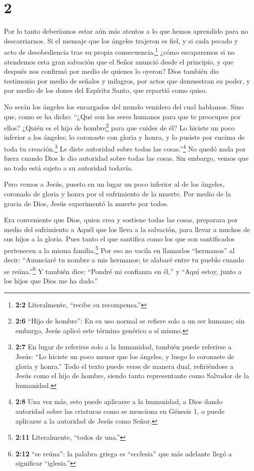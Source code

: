 \hypertarget{section-1}{%
\section{2}\label{section-1}}

 Por lo tanto deberíamos estar aún más atentos a lo que
hemos aprendido para no descarriarnos.  Si el mensaje que
los ángeles trajeron es fiel, y si cada pecado y acto de desobediencia
trae su propia consecuencia,\footnote{\textbf{2:2} Literalmente,
  ``recibe su recompensa.''}  ¿cómo escaparemos si no
atendemos esta gran salvación que el Señor anunció desde el principio, y
que después nos confirmó por medio de quienes lo oyeron? 
Dios también dio testimonio por medio de señales y milagros, por actos
que demuestran su poder, y por medio de los dones del Espíritu Santo,
que repartió como quiso.

 No serán los ángeles los encargados del mundo venidero del
cual hablamos.  Sino que, como se ha dicho: ``¿Qué son los
seres humanos para que te preocupes por ellos? ¿Quién es el hijo de
hombre\footnote{\textbf{2:6} ``Hijo de hombre'': En su uso normal se
  refiere solo a un ser humano; sin embargo, Jesús aplicó este término
  genérico a sí mismo.} para que cuides de él?  Lo hiciste
un poco inferior a los ángeles; lo coronaste con gloria y honra, y lo
pusiste por encima de toda tu creación.\footnote{\textbf{2:7} En lugar
  de referirse solo a la humanidad, también puede referirse a Jesús:
  ``Lo hiciste un poco menor que los ángeles, y luego lo coronaste de
  gloria y honra.'' Todo el texto puede verse de manera dual,
  refiriéndose a Jesús como el hijo de hombre, siendo tanto
  representante como Salvador de la humanidad.}  Le diste
autoridad sobre todas las cosas.''\footnote{\textbf{2:8} Una vez más,
  esto puede aplicarse a la humanidad, a Dios dando autoridad sobre las
  criaturas como se menciona en Génesis 1, o puede aplicarse a la
  autoridad de Jesús como Señor.} No quedó nada por fuera cuando Dios le
dio autoridad sobre todas las cosas. Sin embargo, vemos que no todo está
sujeto a su autoridad todavía.

 Pero vemos a Jesús, puesto en un lugar un poco inferior al
de los ángeles, coronado de gloria y honra por el sufrimiento de la
muerte. Por medio de la gracia de Dios, Jesús experimentó la muerte por
todos.

 Era conveniente que Dios, quien crea y sostiene todas las
cosas, preparara por medio del sufrimiento a Aquél que los lleva a la
salvación, para llevar a muchos de sus hijos a la gloria. 
Pues tanto el que santifica como los que son santificados pertenecen a
la misma familia.\footnote{\textbf{2:11} Literalmente, ``todos de una.''}
Por eso no vacila en llamarlos ``hermanos''  al decir:
``Anunciaré tu nombre a mis hermanos; te alabaré entre tu pueblo cuando
se reúna.''\footnote{\textbf{2:12} ``se reúna'': la palabra griega es
  ``ecclesia'' que más adelante llegó a significar ``iglesia.''}
 Y también dice: ``Pondré mi confianza en él,'' y ``Aquí
estoy, junto a los hijos que Dios me ha dado.''


